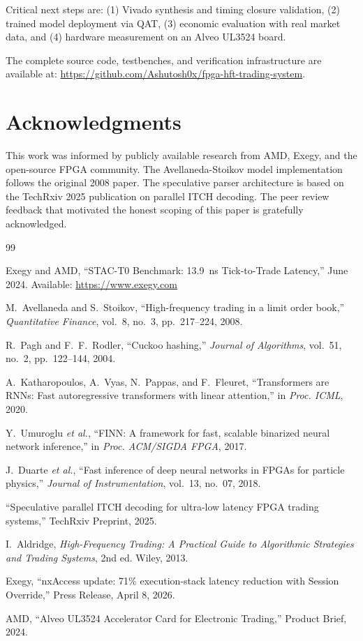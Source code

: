 \documentclass[conference,10pt]{IEEEtran}
\begin{document}
Critical next steps are: (1) Vivado synthesis and timing closure validation, (2) trained model deployment via QAT, (3) economic evaluation with real market data, and (4) hardware measurement on an Alveo UL3524 board.

The complete source code, testbenches, and verification infrastructure are available at: \url{https://github.com/Ashutosh0x/fpga-hft-trading-system}.

\section*{Acknowledgments}

This work was informed by publicly available research from AMD, Exegy, and the open-source FPGA community. The Avellaneda-Stoikov model implementation follows the original 2008 paper. The speculative parser architecture is based on the TechRxiv 2025 publication on parallel ITCH decoding. The peer review feedback that motivated the honest scoping of this paper is gratefully acknowledged.

\begin{thebibliography}{99}

Exegy and AMD, ``STAC-T0 Benchmark: 13.9~ns Tick-to-Trade Latency,'' June 2024. Available: \url{https://www.exegy.com}

M.~Avellaneda and S.~Stoikov, ``High-frequency trading in a limit order book,'' \textit{Quantitative Finance}, vol.~8, no.~3, pp.~217--224, 2008.

R.~Pagh and F.~F.~Rodler, ``Cuckoo hashing,'' \textit{Journal of Algorithms}, vol.~51, no.~2, pp.~122--144, 2004.

A.~Katharopoulos, A.~Vyas, N.~Pappas, and F.~Fleuret, ``Transformers are RNNs: Fast autoregressive transformers with linear attention,'' in \textit{Proc. ICML}, 2020.

Y.~Umuroglu \textit{et al.}, ``FINN: A framework for fast, scalable binarized neural network inference,'' in \textit{Proc. ACM/SIGDA FPGA}, 2017.

J.~Duarte \textit{et al.}, ``Fast inference of deep neural networks in FPGAs for particle physics,'' \textit{Journal of Instrumentation}, vol.~13, no.~07, 2018.

``Speculative parallel ITCH decoding for ultra-low latency FPGA trading systems,'' TechRxiv Preprint, 2025.

I.~Aldridge, \textit{High-Frequency Trading: A Practical Guide to Algorithmic Strategies and Trading Systems}, 2nd ed. Wiley, 2013.

Exegy, ``nxAccess update: 71\% execution-stack latency reduction with Session Override,'' Press Release, April 8, 2026.

AMD, ``Alveo UL3524 Accelerator Card for Electronic Trading,'' Product Brief, 2024.

\end{thebibliography}
\end{document}
